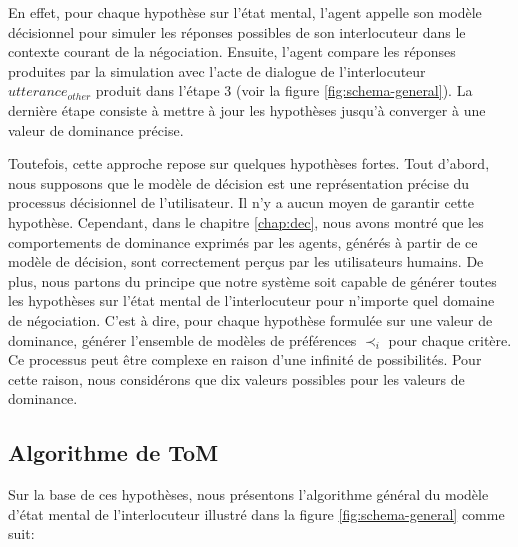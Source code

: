 En effet, pour chaque hypothèse sur l'état mental, l'agent appelle son modèle décisionnel  pour simuler les réponses possibles de son interlocuteur dans le contexte courant de la négociation. Ensuite, l'agent compare les réponses produites par la simulation avec l'acte de dialogue de l'interlocuteur $utterance_{other}$ produit dans l'étape 3 (voir la figure \ref{fig:schema-general}). 
La dernière étape consiste à mettre à jour les hypothèses jusqu'à converger à une valeur de dominance précise. 

Toutefois, cette approche repose sur quelques hypothèses fortes. Tout d'abord, nous supposons que le modèle de décision est une représentation précise du processus décisionnel de l'utilisateur. Il n'y a aucun moyen de garantir cette hypothèse. Cependant, dans le chapitre \ref{chap:dec}, nous avons montré que les comportements de dominance exprimés par les agents, générés à partir de ce modèle de décision, sont correctement perçus par les utilisateurs humains. 
De plus, nous partons du principe que notre système soit capable de générer toutes les hypothèses sur l'état mental de l'interlocuteur pour n'importe quel domaine de négociation. C'est à dire, pour chaque hypothèse formulée sur une valeur de dominance, générer l'ensemble de modèles de préférences $\prec_i$ pour chaque critère. Ce processus peut être complexe en raison d'une infinité de possibilités. Pour cette raison, nous considérons que dix valeurs possibles pour les valeurs de dominance. 

\subsection{Algorithme de ToM}
Sur la base de ces hypothèses, nous présentons l'algorithme général du modèle d'état mental de l'interlocuteur illustré dans la figure \ref{fig:schema-general} comme suit:


